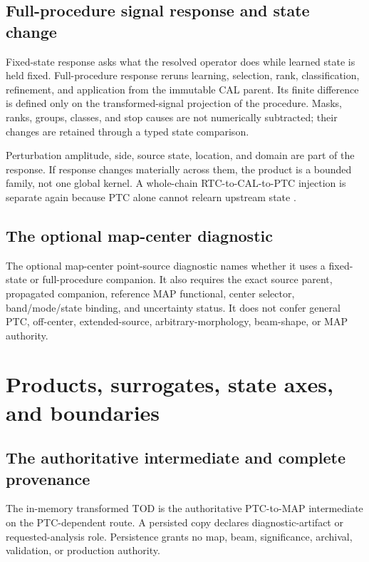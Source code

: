 \documentclass[11pt]{article}
\begin{document}
\subsection{Full-procedure signal response and state change}

Fixed-state response asks what the resolved operator does while learned state
is held fixed. Full-procedure response reruns learning, selection, rank,
classification, refinement, and application from the immutable CAL parent.
Its finite difference is defined only on the transformed-signal projection of
the procedure. Masks, ranks, groups, classes, and stop causes are not
numerically subtracted; their changes are retained through a typed state
comparison.

Perturbation amplitude, side, source state, location, and domain are part of
the response. If response changes materially across them, the product is a
bounded family, not one global kernel. A whole-chain RTC-to-CAL-to-PTC
injection is separate again because PTC alone cannot relearn upstream state
\cite{downes2011}.

\subsection{The optional map-center diagnostic}

The optional map-center point-source diagnostic names whether it uses a
fixed-state or full-procedure companion. It also requires the exact source
parent, propagated companion, reference MAP functional, center selector,
band/mode/state binding, and uncertainty status. It does not confer general
PTC, off-center, extended-source, arbitrary-morphology, beam-shape, or MAP
authority.

\section{Products, surrogates, state axes, and boundaries}
\label{sec:science-products}

\subsection{The authoritative intermediate and complete provenance}

The in-memory transformed TOD is the authoritative PTC-to-MAP intermediate on
the PTC-dependent route. A persisted copy declares diagnostic-artifact or
requested-analysis role. Persistence grants no map, beam, significance,
archival, validation, or production authority.
\end{document}
